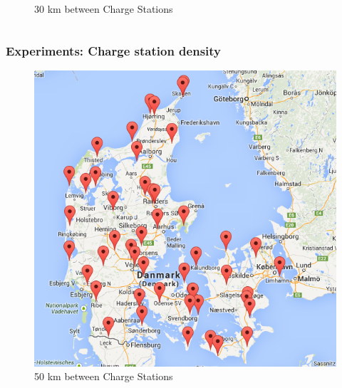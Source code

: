 \begin{frame}
\begin{columns}[c]
\begin{center}
\begin{figure}
	  	\caption{30 km between Charge Stations}
	  	\end{figure}
   \end{center}
   \end{columns} 
\end{frame}

\begin{frame}
  \frametitle{Experiments: Charge station density}
  \begin{center}
  	\begin{figure}
	  \includegraphics[scale=0.3]{images/density50km}  
	  \caption{50 km between Charge Stations}
	\end{figure}
  \end{center}
\end{frame}


